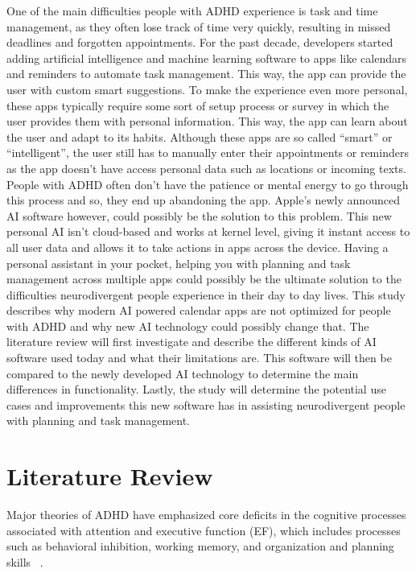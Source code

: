\documentclass[english]{hogent-article}
\begin{document}
One of the main difficulties people with ADHD experience is task and time management, as they often lose track of time very quickly, resulting in missed deadlines and forgotten appointments. For the past decade, developers started adding artificial intelligence and machine learning software to apps like calendars and reminders to automate task management. This way, the app can provide the user with custom smart suggestions. To make the experience even more personal, these apps typically require some sort of setup process or survey in which the user provides them with personal information. This way, the app can learn about the user and adapt to its habits. Although these apps are so called “smart” or “intelligent”, the user still has to manually enter their appointments or reminders as the app doesn't have access personal data such as locations or incoming texts. People with ADHD often don't have the patience or mental energy to go through this process and so, they end up abandoning the app. Apple's newly announced AI software however, could possibly be the solution to this problem. This new personal AI isn't cloud-based and works at kernel level, giving it instant access to all user data and allows it to take actions in apps across the device. Having a personal assistant in your pocket, helping you with planning and task management across multiple apps could possibly be the ultimate solution to the difficulties neurodivergent people experience in their day to day lives. This study describes why modern AI powered calendar apps are not optimized for people with ADHD and why new AI technology could possibly change that. The literature review will first investigate and describe the different kinds of AI software used today and what their limitations are. This software will then be compared to the newly developed AI technology to determine the main differences in functionality. Lastly, the study will determine the potential use cases and improvements this new software has in assisting neurodivergent people with planning and task management.


\section{Literature Review}%
\label{sec:literature review}

Major theories of ADHD have emphasized core deficits in the cognitive processes associated with attention and executive function (EF), which includes processes such as behavioral inhibition, working memory, and organization and planning skills ~\autocite{Molitor2017}.
\end{document}
